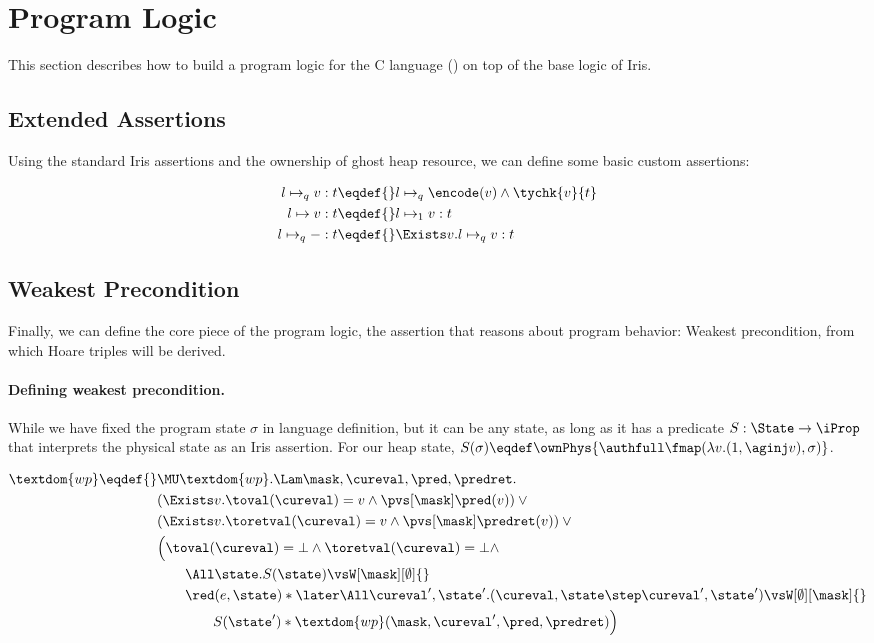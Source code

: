 \section{Program Logic}
\label{sec:program-logic}

This section describes how to build a program logic for the C language (\cf {}) on top of the base logic of Iris.

\subsection{Extended Assertions}

Using the standard Iris assertions and the ownership of ghost heap resource, we can define some basic custom assertions:

\begin{align*}
l \mapsto_q v : t \eqdef{}&  l \mapsto_q \encode(v) \land \tychk{v}{t} \\
l \mapsto v : t              \eqdef{}& l \mapsto_1 v : t\\
l \mapsto_q - : t            \eqdef{}& \Exists v. l \mapsto_q v : t
\end{align*}

\subsection{Weakest Precondition}

Finally, we can define the core piece of the program logic, the assertion that reasons about program behavior: Weakest precondition, from which Hoare triples will be derived.

\paragraph{Defining weakest precondition.}

While we have fixed the program state $\sigma$ in language definition, but it can be any state, as long as it has a predicate
$S : \State \to \iProp$ that interprets the physical state as an Iris assertion.
For our heap state, $S(\sigma) \eqdef \ownPhys{\authfull \fmap (\lambda v. (1, \aginj v), \sigma)}$.

\begin{align*}
  \textdom{wp} \eqdef{}& \MU \textdom{wp}. \Lam \mask, \cureval, \pred, \predret. \\
        & (\Exists v. \toval(\cureval) = v \land \pvs[\mask] \pred(v)) \lor {}\\
        & (\Exists v. \toretval(\cureval) = v \land \pvs[\mask] \predret (v)) \lor {}\\
        & \Bigl(\toval(\cureval) = \bot \land \toretval(\cureval) = \bot \land \\
        &\qquad \All \state. S(\state) \vsW[\mask][\emptyset] {}\\
        &\qquad \red(e, \state) * \later\All \cureval', \state'. (\cureval, \state \step \cureval', \state') \vsW[\emptyset][\mask] {}\\
        &\qquad\qquad S(\state') * \textdom{wp}(\mask, \cureval', \pred, \predret)\Bigr) \\
\end{align*}

